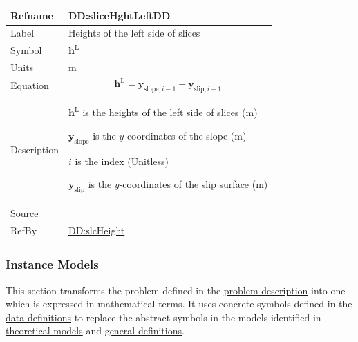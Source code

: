 \documentclass[12pt]{article}
\begin{document}
\medskip
\noindent
\begin{minipage}{\textwidth}
\begin{tabular}{>{\raggedright}p{}>{\raggedright\arraybackslash}p{}}
\toprule \textbf{Refname} & \textbf{DD:sliceHghtLeftDD}
\label{DD:sliceHghtLeftDD}
\\ \midrule
Label & Heights of the left side of slices
        
\\ \midrule
Symbol & ${\symbf{h}^{\text{L}}}$
         
\\ \midrule
Units & ${\text{m}}$
        
\\ \midrule
Equation & \begin{displaymath}
           {\symbf{h}^{\text{L}}}={\symbf{y}_{\text{slope},i-1}}-{\symbf{y}_{\text{slip},i-1}}
           \end{displaymath}
\\ \midrule
Description & \begin{symbDescription}
              \item{${\symbf{h}^{\text{L}}}$ is the heights of the left side of slices (${\text{m}}$)}
              \item{${\symbf{y}_{\text{slope}}}$ is the $y$-coordinates of the slope (${\text{m}}$)}
              \item{$i$ is the index (Unitless)}
              \item{${\symbf{y}_{\text{slip}}}$ is the $y$-coordinates of the slip surface (${\text{m}}$)}
              \end{symbDescription}
\\ \midrule
Source & \cite{fredlund1977}
         
\\ \midrule
RefBy & \hyperref[DD:slcHeight]{DD:slcHeight}
        
\\ \bottomrule
\end{tabular}
\end{minipage}

\subsubsection{Instance Models}
\label{Sec:IMs}
This section transforms the problem defined in the \hyperref[Sec:ProbDesc]{problem description} into one which is expressed in mathematical terms. It uses concrete symbols defined in the \hyperref[Sec:DDs]{data definitions} to replace the abstract symbols in the models identified in \hyperref[Sec:TMs]{theoretical models} and \hyperref[Sec:GDs]{general definitions}.
\end{document}
